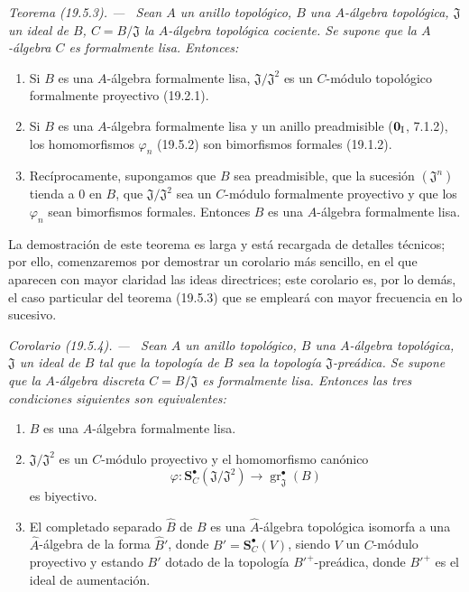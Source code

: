 \documentclass[10pt,oneside]{book}
\makeatletter
\newcommand{\gr}{\operatorname{gr}}
\newcommand{\setmanualcurrentlabel}[1]{\def\@currentlabel{#1}}
\newenvironment{theorem}[1][]{%
  \setmanualcurrentlabel{#1}\par\medskip\noindent\itshape Teorema (#1). ---\ }{\par}
\newenvironment{corollary}[1][]{%
  \setmanualcurrentlabel{#1}\par\medskip\noindent\itshape Corolario (#1). ---\ }{\par}
\makeatother
\begin{document}
\begin{theorem}[19.5.3]
\label{0.19.5.3-es}
Sean $A$ un anillo topológico, $B$ una $A$-álgebra topológica,
$\mathfrak J$ un ideal de $B$, $C=B/\mathfrak J$ la $A$-álgebra topológica
cociente. Se supone que la $A$-álgebra $C$ es formalmente lisa.
Entonces:
\begin{enumerate}
  \item[\rm(i)] Si $B$ es una $A$-álgebra formalmente lisa,
  $\mathfrak J/\mathfrak J^2$ es un $C$-módulo topológico formalmente
  proyectivo \textup{(19.2.1)}.
  \item[\rm(ii)] Si $B$ es una $A$-álgebra formalmente lisa y un anillo
  preadmisible \textup{($\mathbf 0_{\rm I}$, 7.1.2)}, los homomorfismos $\varphi_n$
  \textup{(19.5.2)} son bimorfismos formales \textup{(19.1.2)}.
  \item[\rm(iii)] Recíprocamente, supongamos que $B$ sea preadmisible, que la
  sucesión $(\mathfrak J^n)$ tienda a $0$ en $B$, que
  $\mathfrak J/\mathfrak J^2$ sea un $C$-módulo formalmente proyectivo y que
  los $\varphi_n$ sean bimorfismos formales. Entonces $B$ es una
  $A$-álgebra formalmente lisa.
\end{enumerate}
\end{theorem}

La demostración de este teorema es larga y está recargada de detalles técnicos;
por ello, comenzaremos por demostrar un corolario más sencillo, en el que
aparecen con mayor claridad las ideas directrices; este corolario es, por lo demás,
el caso particular del teorema (19.5.3) que se empleará con mayor frecuencia
en lo sucesivo.

\begin{corollary}[19.5.4]
\label{0.19.5.4-es}
Sean $A$ un anillo topológico, $B$ una $A$-álgebra topológica,
$\mathfrak J$ un ideal de $B$ tal que la topología de $B$ sea la topología
$\mathfrak J$-preádica. Se supone que la $A$-álgebra discreta
$C=B/\mathfrak J$ es formalmente lisa. Entonces las tres condiciones siguientes
son equivalentes:
\begin{enumerate}
  \item[\textup{a)}] $B$ es una $A$-álgebra formalmente lisa.
  \item[\textup{b)}] $\mathfrak J/\mathfrak J^2$ es un $C$-módulo proyectivo y
  el homomorfismo canónico
  \[
    \varphi:\mathbf S_C^\bullet(\mathfrak J/\mathfrak J^2)
    \longrightarrow\gr_{\mathfrak J}^\bullet(B)
  \]
  es biyectivo.
  \item[\textup{c)}] El completado separado $\widehat B$ de $B$ es una
  $\widehat A$-álgebra topológica isomorfa a una $\widehat A$-álgebra de la
  forma $\widehat B'$, donde $B'=\mathbf S_C^\bullet(V)$, siendo $V$ un $C$-módulo
  proyectivo y estando $B'$ dotado de la topología ${B'}^+$-preádica, donde
  ${B'}^+$ es el ideal de aumentación.
\end{enumerate}
\end{corollary}
\end{document}
